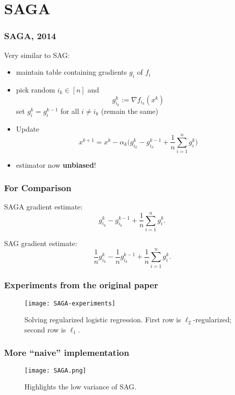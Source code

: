 \documentclass[aspectratio=149]{beamer}
\begin{document}
\section{SAGA}%
\label{sec:}

\begin{frame}
  \frametitle{SAGA, 2014}
  Very similar to SAG:
  \begin{itemize}
    \item maintain table containing gradients $g_i$ of $f_i$
    \item pick random $i_k \in [n]$ and
          \begin{equation}
            g_{i_k}^k := \nabla f_{i_k}(x^{k})
          \end{equation}
          set $g_{i}^k = g_i^{k-1}$ for all $i\neq i_k$ (remain the same)
    \item Update
          \begin{equation}
            x^{k+1} = x^k - \alpha_k  \Big( g_{i_k}^k - g_{i_k}^{k-1} + \frac{1}{n}\sum_{i=1}^{n} g_i^k \Big)
          \end{equation}
    \item estimator now \textbf{unbiased}!
  \end{itemize}
\end{frame}

\begin{frame}
  \frametitle{For Comparison}
  SAGA gradient estimate:
  \begin{equation}
    g_{i_k}^k - g_{i_k}^{k-1} + \frac{1}{n}\sum_{i=1}^{n} g_i^k.
  \end{equation}

  SAG gradient estimate:
  \begin{equation}
    \frac{1}{n}g_{i_k}^k - \frac{1}{n}g_{i_k}^{k-1} + \frac{1}{n}\sum_{i=1}^{n} g_i^k.
  \end{equation}
\end{frame}


\begin{frame}
  \frametitle{Experiments from the original paper}
  \begin{figure}[ht]
    \centering
    \texttt{[image: SAGA-experiments]}
    \caption{Solving regularized logistic regression. First row is $\ell_2$-regularized; second row is $\ell_1$.}
  \end{figure}
\end{frame}


\begin{frame}
  \frametitle{More ``naive'' implementation}

  \begin{figure}[ht]
    \centering
    \texttt{[image: SAGA.png]}
    \caption{Highlights the low variance of SAG.}
  \end{figure}
\end{frame}
\end{document}
